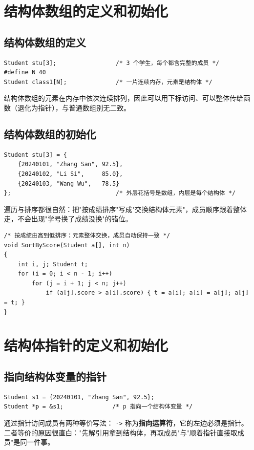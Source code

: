 \section{结构体数组的定义和初始化}
\subsection{结构体数组的定义}
\begin{lstlisting}
Student stu[3];                 /* 3 个学生，每个都含完整的成员 */
#define N 40
Student class1[N];              /* 一片连续内存，元素是结构体 */
\end{lstlisting}
结构体数组的元素在内存中依次连续排列，因此可以用下标访问、可以整体传给函数（退化为指针），与普通数组别无二致。

\subsection{结构体数组的初始化}
\begin{lstlisting}
Student stu[3] = {
    {20240101, "Zhang San", 92.5},
    {20240102, "Li Si",     85.0},
    {20240103, "Wang Wu",   78.5}
};                              /* 外层花括号是数组，内层是每个结构体 */
\end{lstlisting}
遍历与排序都很自然：把"按成绩排序"写成"交换结构体元素"，成员顺序跟着整体走，不会出现"学号换了成绩没换"的错位。
\begin{lstlisting}
/* 按成绩由高到低排序：元素整体交换，成员自动保持一致 */
void SortByScore(Student a[], int n)
{
    int i, j; Student t;
    for (i = 0; i < n - 1; i++)
        for (j = i + 1; j < n; j++)
            if (a[j].score > a[i].score) { t = a[i]; a[i] = a[j]; a[j] = t; }
}
\end{lstlisting}

\section{结构体指针的定义和初始化}
\subsection{指向结构体变量的指针}
\begin{lstlisting}
Student s1 = {20240101, "Zhang San", 92.5};
Student *p = &s1;              /* p 指向一个结构体变量 */
\end{lstlisting}
通过指针访问成员有两种等价写法：
\texttt{->} 称为\textbf{指向运算符}，它的左边必须是指针。二者等价的原因很直白："先解引用拿到结构体，再取成员"与"顺着指针直接取成员"是同一件事。

